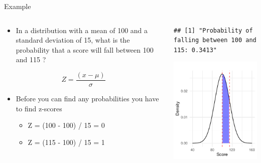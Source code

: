 \documentclass[
  ignorenonframetext,
]{beamer}
\providecommand{\tightlist}{%
  \setlength{\itemsep}{0pt}\setlength{\parskip}{0pt}}
\begin{document}
\begin{frame}[fragile]{Example}
\label{example-5}
\begin{columns}[T]
\begin{column}{0.5\textwidth}
\begin{itemize}
\tightlist
\item
  In a distribution with a mean of 100 and a standard deviation of 15,
  what is the probability that a score will fall between 100 and 115 ?
\end{itemize}

\[ Z = \frac{(x - \mu)}{\sigma} \]

\vspace{1cm}

\begin{itemize}
\tightlist
\item
  Before you can find any probabilities you have to find z-scores

  \begin{itemize}
  \tightlist
  \item
    Z = (100 - 100) / 15 = 0
  \item
    Z = (115 - 100) / 15 = 1
  \end{itemize}
\end{itemize}
\end{column}

\begin{column}{0.5\textwidth}
\begin{verbatim}
## [1] "Probability of falling between 100 and 115: 0.3413"
\end{verbatim}

\includegraphics{M5-Hypothesis-Testing,-Probability-and-Distribution_files/figure-beamer/unnamed-chunk-22-1.pdf}
\end{column}
\end{columns}
\end{frame}
\end{document}

